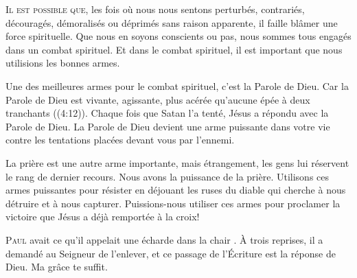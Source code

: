 

\lettrine{I}{l est possible que,}
 les fois où nous nous sentons perturbés, contrariés, découragés,
 démoralisés ou déprimés sans raison apparente, il faille blâmer
 une force spirituelle.
 Que nous en soyons conscients ou pas, nous sommes tous engagés
 dans un combat spirituel. Et dans le combat spirituel,
 il est important que nous utilisions les bonnes armes.

Une des meilleures armes pour le combat spirituel, c'est la Parole de Dieu.
 \Og Car la Parole de Dieu est vivante, agissante, plus acérée
 qu'aucune épée à deux tranchants \Fg{} ((4:12)).
 Chaque fois que Satan l'a tenté, Jésus a répondu avec la Parole de Dieu.
 La Parole de Dieu devient une arme puissante dans votre vie
 contre les tentations placées devant vous par l'ennemi.


La prière est une autre arme importante, mais étrangement,
 les gens lui réservent le rang de dernier recours.
 Nous avons la puissance de la prière. Utilisons ces armes puissantes
 pour résister en déjouant les ruses du diable qui cherche à nous détruire
 et à nous capturer.
 Puissions-nous utiliser ces armes pour proclamer la victoire
 que Jésus a déjà remportée à la croix!

\dvrule






\lettrine{P}{aul} avait ce qu'il appelait une \Og écharde dans la chair \Fg{}.
 À trois reprises, il a demandé au Seigneur de l'enlever,
 et ce passage de l'Écriture est la réponse de Dieu.
 \Og Ma grâce te suffit. \Fg{}

